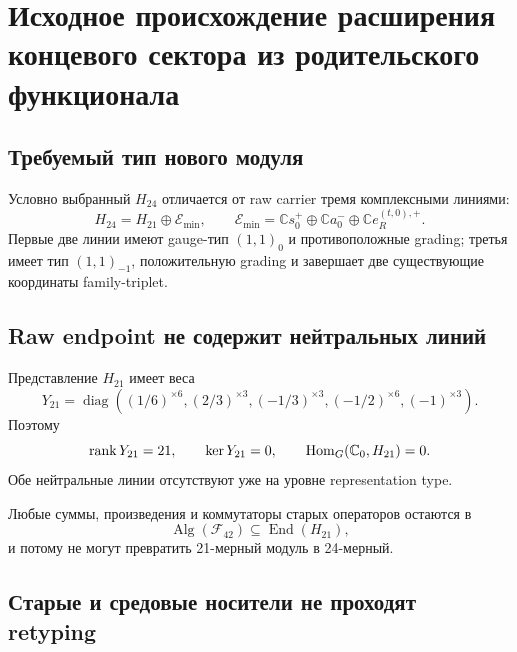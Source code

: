 \chapter{Исходное происхождение расширения концевого сектора из родительского функционала}
\label{ch:v9-endpoint-raw-origin}

\section{Требуемый тип нового модуля}

Условно выбранный $H_{24}$ отличается от raw carrier тремя комплексными
линиями:
\begin{equation}
 H_{24}=H_{21}\oplus\mathcal E_{\min},
 \qquad
 \mathcal E_{\min}=\mathbb C s_0^{+}\oplus
 \mathbb C a_0^{-}\oplus\mathbb C e_R^{(t,0),+}.
 \label{eq:v9-endpoint-required-module}
\end{equation}
Первые две линии имеют gauge-тип $(1,1)_0$ и противоположные grading;
третья имеет тип $(1,1)_{-1}$, положительную grading и завершает две
существующие координаты family-triplet.

\section{Raw endpoint не содержит нейтральных линий}

Представление $H_{21}$ имеет веса
\begin{equation}
 Y_{21}=\operatorname{diag}
 \left((1/6)^{\times6},(2/3)^{\times3},(-1/3)^{\times3},
 (-1/2)^{\times6},(-1)^{\times3}\right).
 \label{eq:v9-endpoint-hypercharge-spectrum}
\end{equation}
Поэтому
\begin{equation}
 \operatorname{rank} Y_{21}=21,
 \qquad \ker Y_{21}=0,
 \qquad \operatorname{Hom}_G(\mathbb C_0,H_{21})=0.
 \label{eq:v9-endpoint-neutral-no-go}
\end{equation}
Обе нейтральные линии отсутствуют уже на уровне representation type.

Любые суммы, произведения и коммутаторы старых операторов остаются в
\begin{equation}
 \operatorname{Alg}(\mathcal F_{42})\subseteq\operatorname{End}(H_{21}),
 \label{eq:v9-endpoint-algebraic-closure}
\end{equation}
и потому не могут превратить 21-мерный модуль в 24-мерный.

\section{Старые и средовые носители не проходят retyping}

